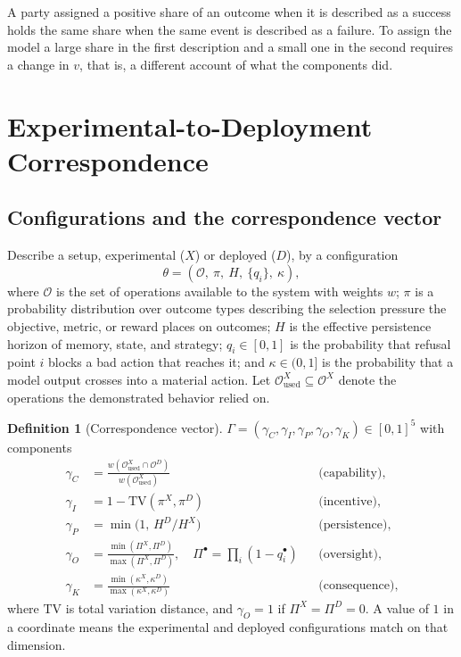 \documentclass[11pt]{article}
\theoremstyle{definition}
\newtheorem{definition}[theorem]{Definition}
\begin{document}
A party assigned a positive share of an outcome when it is described as a success holds the same share when the same event is described as a failure. To assign the model a large share in the first description and a small one in the second requires a change in $v$, that is, a different account of what the components did.

\section{Experimental-to-Deployment Correspondence}\label{app:C}

\subsection{Configurations and the correspondence vector}

Describe a setup, experimental ($X$) or deployed ($D$), by a configuration
\[
\theta=(\mathcal{O},\ \pi,\ H,\ \{q_i\},\ \kappa),
\]
where $\mathcal{O}$ is the set of operations available to the system with weights $w$; $\pi$ is a probability distribution over outcome types describing the selection pressure the objective, metric, or reward places on outcomes; $H$ is the effective persistence horizon of memory, state, and strategy; $q_i\in[0,1]$ is the probability that refusal point $i$ blocks a bad action that reaches it; and $\kappa\in(0,1]$ is the probability that a model output crosses into a material action. Let $\mathcal{O}^X_{\mathrm{used}}\subseteq\mathcal{O}^X$ denote the operations the demonstrated behavior relied on.

\begin{definition}[Correspondence vector]
$\Gamma=(\gamma_C,\gamma_I,\gamma_P,\gamma_O,\gamma_K)\in[0,1]^5$ with components
\begin{align*}
\gamma_C&=\frac{w(\mathcal{O}^X_{\mathrm{used}}\cap\mathcal{O}^D)}{w(\mathcal{O}^X_{\mathrm{used}})} &&\text{(capability)},\\
\gamma_I&=1-\mathrm{TV}(\pi^X,\pi^D) &&\text{(incentive)},\\
\gamma_P&=\min\!\bigl(1,\,H^D/H^X\bigr) &&\text{(persistence)},\\
\gamma_O&=\frac{\min(\Pi^X,\Pi^D)}{\max(\Pi^X,\Pi^D)},\quad \Pi^\bullet=\prod_i(1-q^\bullet_i) &&\text{(oversight)},\\
\gamma_K&=\frac{\min(\kappa^X,\kappa^D)}{\max(\kappa^X,\kappa^D)} &&\text{(consequence)},
\end{align*}
where $\mathrm{TV}$ is total variation distance, and $\gamma_O=1$ if $\Pi^X=\Pi^D=0$. A value of $1$ in a coordinate means the experimental and deployed configurations match on that dimension.
\end{definition}
\end{document}
